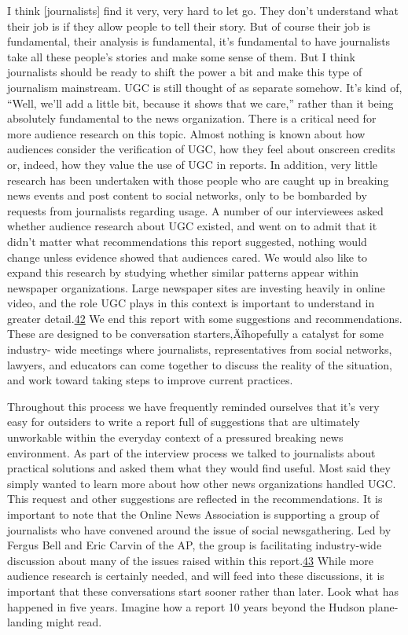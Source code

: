 \documentclass[symmetric, notoc, nobib]{towcenter-book}
\begin{document}
I think [journalists] find it very, very hard to let go. They don't
understand what their job is if they allow people to tell their story.
But of course their job is fundamental, their analysis is fundamental,
it's fundamental to have journalists take all these people's stories
and make some sense of them. But I think journalists should
be ready to shift the power a bit and make this type of journalism
mainstream. UGC is still thought of as separate somehow. It's kind
of, ``Well, we'll add a little bit, because it shows that we care,'' rather
than it being absolutely fundamental to the news organization.
There is a critical need for more audience research on this topic. Almost
nothing is known about how audiences consider the verification of UGC,
how they feel about onscreen credits or, indeed, how they value the use of
UGC in reports. In addition, very little research has been undertaken with
those people who are caught up in breaking news events and post content to
social networks, only to be bombarded by requests from journalists regarding
usage. A number of our interviewees asked whether audience research
about UGC existed, and went on to admit that it didn't matter what recommendations
this report suggested, nothing would change unless evidence
showed that audiences cared.
We would also like to expand this research by studying whether similar patterns
appear within newspaper organizations. Large newspaper sites are
investing heavily in online video, and the role UGC plays in this context is
important to understand in greater detail.{\href{#endnotes}{42}}
We end this report with some suggestions and recommendations. These are
designed to be conversation starters‚Äîhopefully a catalyst for some industry-
wide meetings where journalists, representatives from social networks,
lawyers, and educators can come together to discuss the reality of the situation,
and work toward taking steps to improve current practices.

Throughout this process we have frequently reminded ourselves that it's
very easy for outsiders to write a report full of suggestions that are ultimately
unworkable within the everyday context of a pressured breaking
news environment. As part of the interview process we talked to journalists
about practical solutions and asked them what they would find useful.
Most said they simply wanted to learn more about how other news organizations
handled UGC. This request and other suggestions are reflected in
the recommendations. It is important to note that the Online News Association
is supporting a group of journalists who have convened around the
issue of social newsgathering. Led by Fergus Bell and Eric Carvin of the AP,
the group is facilitating industry-wide discussion about many of the issues
raised within this report.{\href{#endnotes}{43}}
While more audience research is certainly needed, and will feed into these
discussions, it is important that these conversations start sooner rather
than later. Look what has happened in five years. Imagine how a report 10
years beyond the Hudson plane-landing might read.
\end{document}
